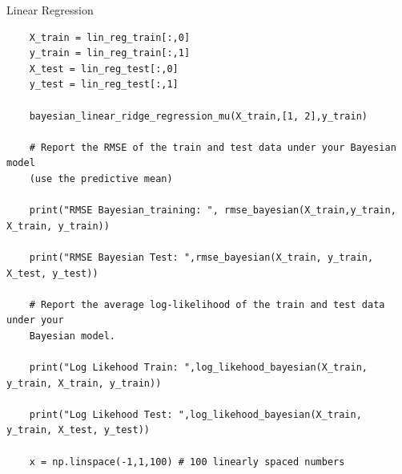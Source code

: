 \begin{task}{Linear Regression}
\begin{subtask}
\begin{lstlisting}
    X_train = lin_reg_train[:,0]
    y_train = lin_reg_train[:,1]
    X_test = lin_reg_test[:,0]
    y_test = lin_reg_test[:,1]
    
    bayesian_linear_ridge_regression_mu(X_train,[1, 2],y_train)
    
    # Report the RMSE of the train and test data under your Bayesian model 
    (use the predictive mean)
    
    print("RMSE Bayesian_training: ", rmse_bayesian(X_train,y_train, X_train, y_train))
    
    print("RMSE Bayesian Test: ",rmse_bayesian(X_train, y_train, X_test, y_test))
    
    # Report the average log-likelihood of the train and test data under your 
    Bayesian model.
    
    print("Log Likehood Train: ",log_likehood_bayesian(X_train, y_train, X_train, y_train))
    
    print("Log Likehood Test: ",log_likehood_bayesian(X_train, y_train, X_test, y_test))
    
    x = np.linspace(-1,1,100) # 100 linearly spaced numbers
    

\end{lstlisting}
\end{subtask}
\end{task}
